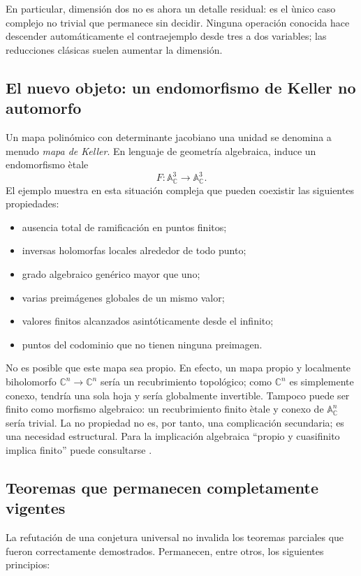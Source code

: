 \documentclass[11pt]{article}
\theoremstyle{definition}
\theoremstyle{remark}
\newcommand{\C}{\mathbb{C}}
\newcommand{\A}{\mathbb{A}}
\begin{document}
En particular, dimensi\'on dos no es ahora un detalle residual: es el \`unico
caso complejo no trivial que permanece sin decidir. Ninguna operaci\'on
conocida hace descender autom\'aticamente el contraejemplo desde tres a dos
variables; las reducciones cl\'asicas suelen aumentar la dimensi\'on.

\subsection{El nuevo objeto: un endomorfismo de Keller no automorfo}

Un mapa polin\'omico con determinante jacobiano una unidad se denomina a menudo
\emph{mapa de Keller}. En lenguaje de geometr\'ia algebraica, induce un
endomorfismo \`etale
\[
F\colon\A^3_{\C}\longrightarrow\A^3_{\C}.
\]
El ejemplo muestra en esta situaci\'on compleja que pueden
coexistir las siguientes propiedades:
\begin{itemize}
\item ausencia total de ramificaci\'on en puntos finitos;
\item inversas holomorfas locales alrededor de todo punto;
\item grado algebraico gen\'erico mayor que uno;
\item varias preim\'agenes globales de un mismo valor;
\item valores finitos alcanzados asint\'oticamente desde el infinito;
\item puntos del codominio que no tienen ninguna preimagen.
\end{itemize}

No es posible que este mapa sea propio. En efecto, un mapa propio y localmente
biholomorfo $\C^n\to\C^n$ ser\'ia un recubrimiento topol\'ogico; como $\C^n$ es
simplemente conexo, tendr\'ia una sola hoja y ser\'ia globalmente invertible.
Tampoco puede ser finito como morfismo algebraico: un recubrimiento finito
\`etale y conexo de $\A^n_{\C}$ ser\'ia trivial. La no propiedad no es, por
tanto, una complicaci\'on secundaria; es una necesidad estructural. Para la
implicaci\'on algebraica ``propio y cuasifinito implica finito'' puede
consultarse \cite{Stacks0F2P}.

\subsection{Teoremas que permanecen completamente vigentes}

La refutaci\'on de una conjetura universal no invalida los teoremas parciales
que fueron correctamente demostrados. Permanecen, entre otros, los siguientes
principios:
\end{document}
